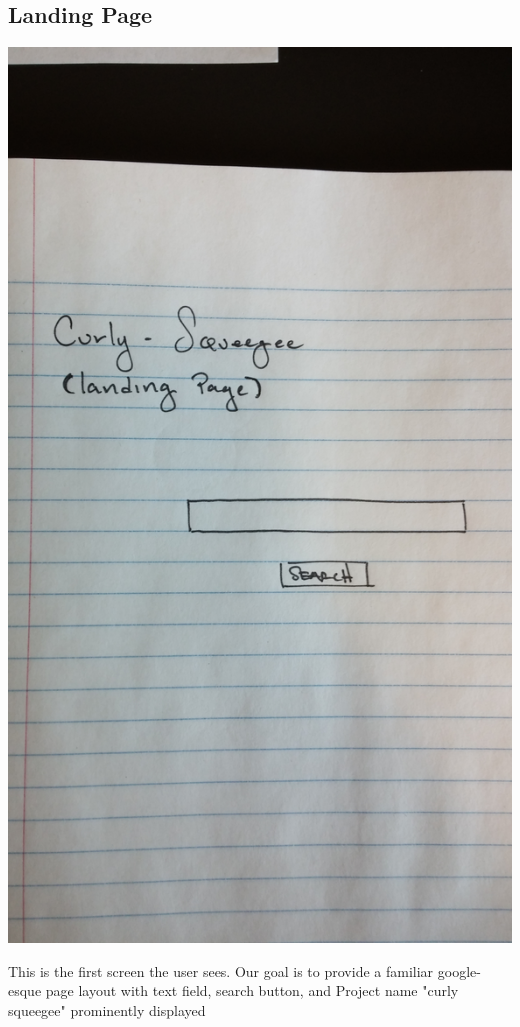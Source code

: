 \documentclass[12pt]{article}
\begin{document}
\subsection{Landing Page}
\begin{center}
 \includegraphics[angle=-90,scale=0.05]{landing}
\end{center}
 This is the first screen the user sees.  Our goal is to provide a familiar google-esque page layout with text field, search button, and Project name "curly squeegee" prominently displayed
 
\end{document}
